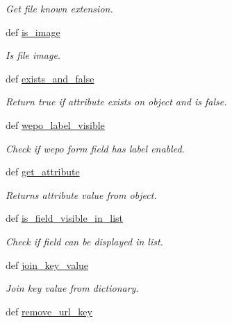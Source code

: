 \begin{DoxyCompactItemize}
\begin{DoxyCompactList}\small\item\em Get file known extension. \end{DoxyCompactList}\item 
def \hyperlink{namespacecore_1_1templatetags_1_1core__filters_aa9998b11257b681d8baf20044d3aae43}{is\-\_\-image}
\begin{DoxyCompactList}\small\item\em Is file image. \end{DoxyCompactList}\item 
def \hyperlink{namespacecore_1_1templatetags_1_1core__filters_a0d8d262b5bf6d3416adb9338fc601dbe}{exists\-\_\-and\-\_\-false}
\begin{DoxyCompactList}\small\item\em Return true if attribute exists on object and is false. \end{DoxyCompactList}\item 
def \hyperlink{namespacecore_1_1templatetags_1_1core__filters_a3ca154318e66bfc39065d3bab5758eec}{wepo\-\_\-label\-\_\-visible}
\begin{DoxyCompactList}\small\item\em Check if wepo form field has label enabled. \end{DoxyCompactList}\item 
def \hyperlink{namespacecore_1_1templatetags_1_1core__filters_a29b7c9bae04cd46f1c820d9ddf0d4061}{get\-\_\-attribute}
\begin{DoxyCompactList}\small\item\em Returns attribute value from object. \end{DoxyCompactList}\item 
def \hyperlink{namespacecore_1_1templatetags_1_1core__filters_a5a5ae5f46e0b241473172eeadc2c11c2}{is\-\_\-field\-\_\-visible\-\_\-in\-\_\-list}
\begin{DoxyCompactList}\small\item\em Check if field can be displayed in list. \end{DoxyCompactList}\item 
def \hyperlink{namespacecore_1_1templatetags_1_1core__filters_a9c7d617e0a0b89171a6dcd819d3e1328}{join\-\_\-key\-\_\-value}
\begin{DoxyCompactList}\small\item\em Join key value from dictionary. \end{DoxyCompactList}\item 
def \hyperlink{namespacecore_1_1templatetags_1_1core__filters_adf4b8f2d1560742e24229201a76a44a1}{remove\-\_\-url\-\_\-key}

\end{DoxyCompactItemize}
